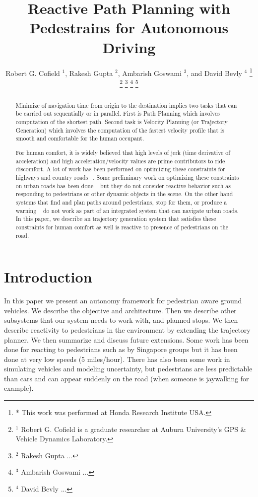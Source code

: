 \documentclass[letterpaper, 10 pt, conference]{ieeeconf}  %
\title{\LARGE \bf
  Reactive Path Planning with Pedestrains for Autonomous Driving
}
\author{
  Robert G. Cofield $^{1}$,
  Rakesh Gupta $^{2}$,
  Ambarish Goswami $^{3}$,
  and
  David Bevly $^{4}$
  \thanks{
    * This work was performed at Honda Research Institute USA.
  }
  \thanks{
    $^{1}$ Robert G. Cofield is a graduate researcher at Auburn University's GPS \& Vehicle Dynamics Laboratory.
  }
  \thanks{
    $^{2}$ Rakesh Gupta ...
  }
  \thanks{
    $^{3}$ Ambarish Goswami ... 
  }
  \thanks{
    $^{4}$ David Bevly ...
  }
}
\begin{document}
\maketitle
\thispagestyle{empty}
\pagestyle{empty}

\begin{abstract}

Minimize of navigation time from origin to the destination implies two tasks that can be carried out sequentially or in parallel. First is Path Planning which involves computation of the shortest path. Second task is Velocity Planning (or Trajectory Generation) which involves the computation of the fastest velocity profile that is smooth and comfortable for the human occupant.

For human comfort, it is widely believed that high levels of jerk (time derivative of acceleration) and high acceleration/velocity values are prime contributors to ride discomfort. A lot of work has been performed on optimizing these constraints for highways and country roads ~\cite{ziegler14,bahram15,xu12,CHEB15CI}. Some preliminary work on optimizing these constraints on urban roads has been done ~\cite{Rastelli14,Li15} but they do not consider reactive behavior such as responding to pedestrians or other dynamic objects in the scene. On the other hand systems that find and plan paths around pedestrians, stop for them, or produce a warning ~\cite{pradalier05,benenson06,gu14,mogelmose15,johnson13} do not work as part of an integrated system that can navigate urban roads. In this paper, we describe an trajectory generation system that satisfies these constraints for human comfort as well is reactive to presence of pedestrians on the road.


\end{abstract}

\section{Introduction} \label{sec:introduction}

In this paper we present an autonomy framework for pedestrian aware ground vehicles. We describe the objective and architecture.
Then we describe other subsystems that our system needs to work with, and planned stops. We then describe
reactivity to pedestrians in the environment by extending the trajectory planner. We then summarize and discuss future extensions.
Some work has been done for reacting to pedestrians such as by Singapore groups but it has been done
at very low speeds (5 miles/hour). There has also been some work in simulating vehicles and modeling
uncertainty, but pedestrians are less predictable than cars and can appear suddenly on the road 
(when someone is jaywalking for example). 
\end{document}
